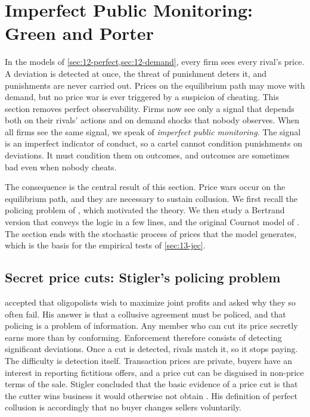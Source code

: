 \section{Imperfect Public Monitoring: Green and Porter}\label{sec:12-public}

In the models of \cref{sec:12-perfect,sec:12-demand}, every firm sees every rival's price. A deviation is detected
at once, the threat of punishment deters it, and punishments are never carried out. Prices on the equilibrium path
may move with demand, but no price war is ever triggered by a suspicion of cheating. This section removes perfect
observability. Firms now see only a signal that depends both on their rivals' actions and on demand shocks that
nobody observes. When all firms see the same signal, we speak of \emph{imperfect public monitoring}. The signal is
an imperfect indicator of conduct, so a cartel cannot condition punishments on deviations. It must condition them on
outcomes, and outcomes are sometimes bad even when nobody cheats.

The consequence is the central result of this section. Price wars occur on the equilibrium path, and they are
necessary to sustain collusion. We first recall the policing problem of \citet{Stigler1964}, which motivated the
theory. We then study a Bertrand version that conveys the logic in a few lines, and the original Cournot model of
\citet{GreenPorter1984}. The section ends with the stochastic process of prices that the model generates, which is
the basis for the empirical tests of \cref{sec:13-jec}.

\subsection{Secret price cuts: Stigler's policing problem}\label{sec:12-stigler-recap}

\citet{Stigler1964} accepted that oligopolists wish to maximize joint profits and asked why they so often fail.
His answer is that a collusive agreement must be policed, and that policing is a problem of information. Any member
who can cut its price secretly earns more than by conforming. Enforcement therefore consists of detecting
significant deviations. Once a cut is detected, rivals match it, so it stops paying. The difficulty is detection
itself. Transaction prices are private, buyers have an interest in reporting fictitious offers, and a price cut can
be disguised in non-price terms of the sale. Stigler concluded that the basic evidence of a price cut is that the
cutter wins business it would otherwise not obtain \citep[Section II]{Stigler1964}. His definition of perfect
collusion is accordingly that no buyer changes sellers voluntarily.


